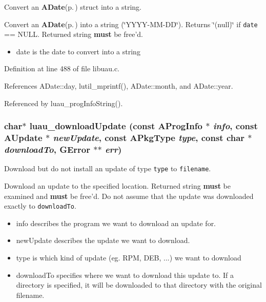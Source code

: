 Convert an {\bf ADate}{\rm (p.\,\pageref{structADate})} struct into a string. 

Convert an {\bf ADate}{\rm (p.\,\pageref{structADate})} into a string (\char`\"{}YYYY-MM-DD\char`\"{}). Returns \char`\"{}(null)\char`\"{} if {\tt date} == NULL. Returned string {\bf must} be free'd.

\begin{itemize}
\item date is the date to convert into a string 
\end{itemize}


Definition at line 488 of file libuau.c.

References ADate::day, lutil\_\-mprintf(), ADate::month, and ADate::year.

Referenced by luau\_\-prog\-Info\-String().
\subsubsection{\setlength{\rightskip}{0pt plus 5cm}char$\ast$ luau\_\-download\-Update (const {\bf AProg\-Info} $\ast$ {\em info}, const {\bf AUpdate} $\ast$ {\em new\-Update}, const {\bf APkg\-Type} {\em type}, const char $\ast$ {\em download\-To}, GError $\ast$$\ast$ {\em err})}\label{libuau_8c_a11}


Download but do not install an update of type {\tt type} to {\tt filename}. 

Download an update to the specified location. Returned string {\bf must} be examined and {\bf must} be free'd. Do not assume that the update was downloaded exactly to {\tt download\-To}.

\begin{itemize}
\item info describes the program we want to download an update for. \item new\-Update describes the update we want to download. \item type is which kind of update (eg. RPM, DEB, ...) we want to download \item download\-To specifies where we want to download this update to. If a directory is specified, it will be downloaded to that directory with the original filename. 
\end{itemize}


